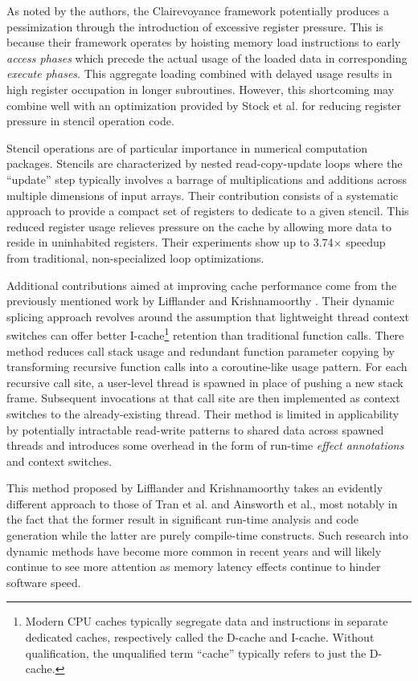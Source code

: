 \documentclass[nobib]{tufte-handout}
\begin{document}
As noted by the authors, the Clairevoyance framework potentially produces a pessimization through the introduction of excessive register pressure.  This is because their framework operates by hoisting memory load instructions to early \emph{access phases} which precede the actual usage of the loaded data in corresponding \emph{execute phases}.  This aggregate loading combined with delayed usage results in high register occupation in longer subroutines.  However, this shortcoming may combine well with an optimization provided by Stock et al. for reducing register pressure in stencil operation code.  

Stencil operations are of particular importance in numerical computation packages.  Stencils are characterized by nested read-copy-update loops where the ``update'' step typically involves a barrage of multiplications and additions across multiple dimensions of input arrays.  Their contribution consists of a systematic approach to provide a compact set of registers to dedicate to a given stencil.  This reduced register usage relieves pressure on the cache by allowing more data to reside in uninhabited registers.  Their experiments show up to 3.74$\times$ speedup from traditional, non-specialized loop optimizations.  

Additional contributions aimed at improving cache performance come from the previously mentioned work by Lifflander and Krishnamoorthy \cite{Lifflander}.  Their dynamic splicing approach revolves around the assumption that lightweight thread context switches can offer better I-cache\footnote{Modern CPU caches typically segregate data and instructions in separate dedicated caches, respectively called the D-cache and I-cache.  Without qualification, the unqualified term ``cache'' typically refers to just the D-cache.} retention than traditional function calls.  There method reduces call stack usage and redundant function parameter copying by transforming recursive function calls into a coroutine-like usage pattern.  For each recursive call site, a user-level thread is spawned in place of pushing a new stack frame.  Subsequent invocations at that call site are then implemented as context switches to the already-existing thread.  Their method is limited in applicability by potentially intractable read-write patterns to shared data across spawned threads and introduces some overhead in the form of run-time \emph{effect annotations} and context switches. 

This method proposed by Lifflander and Krishnamoorthy takes an evidently different approach to those of Tran et al. and Ainsworth et al., most notably in the fact that the former result in significant run-time analysis and code generation while the latter are purely compile-time constructs.  Such research into dynamic methods have become more common in recent years and will likely continue to see more attention as memory latency effects continue to hinder software speed.  
\end{document}
